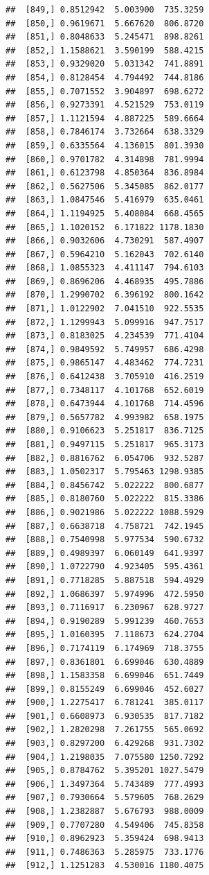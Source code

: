 \documentclass[article]{jss}\usepackage[]{graphicx}\usepackage[]{xcolor}
\makeatletter
\newenvironment{kframe}{%
 \def\at@end@of@kframe{}%
 \ifinner\ifhmode%
  \def\at@end@of@kframe{\end{minipage}}%
  \begin{minipage}{\columnwidth}%
 \fi\fi%
 \def\FrameCommand##1{\hskip\@totalleftmargin \hskip-\fboxsep
 \colorbox{shadecolor}{##1}\hskip-\fboxsep
     \hskip-\linewidth \hskip-\@totalleftmargin \hskip\columnwidth}%
 \MakeFramed {\advance\hsize-\width
   \@totalleftmargin\z@ \linewidth\hsize
   \@setminipage}}%
 {\par\unskip\endMakeFramed%
 \at@end@of@kframe}
\newenvironment{knitrout}{}{} %
\makeatother
\begin{document}
\begin{knitrout}
\begin{kframe}
\begin{verbatim}
##  [849,] 0.8512942  5.003900  735.3259
##  [850,] 0.9619671  5.667620  806.8720
##  [851,] 0.8048633  5.245471  898.8261
##  [852,] 1.1588621  3.590199  588.4215
##  [853,] 0.9329020  5.031342  741.8891
##  [854,] 0.8128454  4.794492  744.8186
##  [855,] 0.7071552  3.904897  698.6272
##  [856,] 0.9273391  4.521529  753.0119
##  [857,] 1.1121594  4.887225  589.6664
##  [858,] 0.7846174  3.732664  638.3329
##  [859,] 0.6335564  4.136015  801.3930
##  [860,] 0.9701782  4.314898  781.9994
##  [861,] 0.6123798  4.850364  836.8984
##  [862,] 0.5627506  5.345085  862.0177
##  [863,] 1.0847546  5.416979  635.0461
##  [864,] 1.1194925  5.408084  668.4565
##  [865,] 1.1020152  6.171822 1178.1830
##  [866,] 0.9032606  4.730291  587.4907
##  [867,] 0.5964210  5.162043  702.6140
##  [868,] 1.0855323  4.411147  794.6103
##  [869,] 0.8696206  4.468935  495.7886
##  [870,] 1.2990702  6.396192  800.1642
##  [871,] 1.0122902  7.041510  922.5535
##  [872,] 1.1299943  5.099916  947.7517
##  [873,] 0.8183025  4.234539  771.4104
##  [874,] 0.9849592  5.749957  686.4298
##  [875,] 0.9865147  4.483462  774.7231
##  [876,] 0.6412438  3.705910  416.2519
##  [877,] 0.7348117  4.101768  652.6019
##  [878,] 0.6473944  4.101768  714.4596
##  [879,] 0.5657782  4.993982  658.1975
##  [880,] 0.9106623  5.251817  836.7125
##  [881,] 0.9497115  5.251817  965.3173
##  [882,] 0.8816762  6.054706  932.5287
##  [883,] 1.0502317  5.795463 1298.9385
##  [884,] 0.8456742  5.022222  800.6877
##  [885,] 0.8180760  5.022222  815.3386
##  [886,] 0.9021986  5.022222 1088.5929
##  [887,] 0.6638718  4.758721  742.1945
##  [888,] 0.7540998  5.977534  590.6732
##  [889,] 0.4989397  6.060149  641.9397
##  [890,] 1.0722790  4.923405  595.4361
##  [891,] 0.7718285  5.887518  594.4929
##  [892,] 1.0686397  5.974996  472.5950
##  [893,] 0.7116917  6.230967  628.9727
##  [894,] 0.9190289  5.991239  460.7653
##  [895,] 1.0160395  7.118673  624.2704
##  [896,] 0.7174119  6.174969  718.3755
##  [897,] 0.8361801  6.699046  630.4889
##  [898,] 1.1583358  6.699046  651.7449
##  [899,] 0.8155249  6.699046  452.6027
##  [900,] 1.2275417  6.781241  385.0117
##  [901,] 0.6608973  6.930535  817.7182
##  [902,] 1.2820298  7.261755  565.0692
##  [903,] 0.8297200  6.429268  931.7302
##  [904,] 1.2198035  7.075580 1250.7292
##  [905,] 0.8784762  5.395201 1027.5479
##  [906,] 1.3497364  5.743489  777.4993
##  [907,] 0.7930664  5.579605  768.2629
##  [908,] 1.2382887  5.676793  988.0009
##  [909,] 0.7707280  4.549406  745.8358
##  [910,] 0.8962923  5.359424  698.9413
##  [911,] 0.7486363  5.285975  733.1776
##  [912,] 1.1251283  4.530016 1180.4075

\end{verbatim}
\end{kframe}
\end{knitrout}
\end{document}
